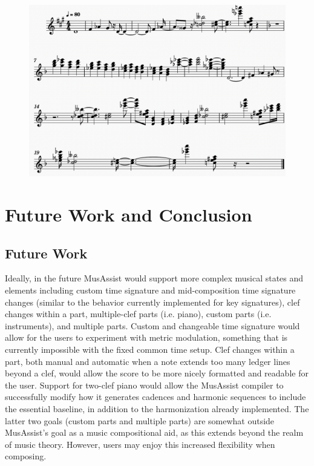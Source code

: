 \documentclass{report}
\begin{document}
\begin{figure}[h!]
\centering
\includegraphics[width=\textwidth]{images/program1}
\end{figure}

\chapter{Future Work and Conclusion}
\section{Future Work}
Ideally, in the future MusAssist would support more complex musical states and elements including custom time signature and mid-composition time signature changes (similar to the behavior currently implemented for key signatures), clef changes within a part, multiple-clef parts (i.e. piano), custom parts (i.e. instruments), and multiple parts. Custom and changeable time signature would allow for the users to experiment with metric modulation, something that is currently impossible with the fixed common time setup. Clef changes within a part, both manual and automatic when a note extends too many ledger lines beyond a clef, would allow the score to be more nicely formatted and readable for the user. Support for two-clef piano would allow the MusAssist compiler to successfully modify how it generates cadences and harmonic sequences to include the essential baseline, in addition to the harmonization already implemented. The latter two goals (custom parts and multiple parts) are somewhat outside MusAssist's goal as a music compositional aid, as this extends beyond the realm of music theory. However, users may enjoy this increased flexibility when composing.
\end{document}
